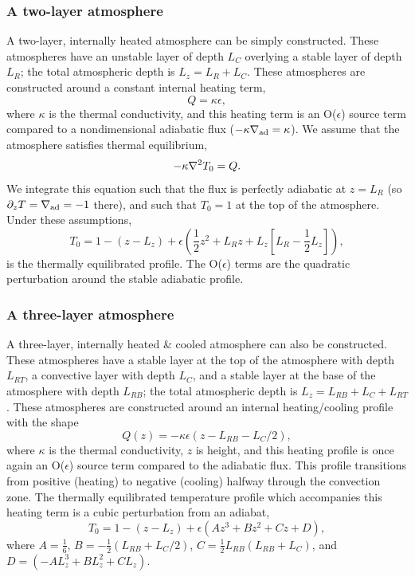 \subsubsection{A two-layer atmosphere}
A two-layer, internally heated atmosphere can be simply constructed.
These atmospheres have an unstable layer of depth $L_C$ overlying a stable layer of depth $L_R$; the total atmospheric depth is $L_z = L_R + L_C$.
These atmospheres are constructed around a constant internal heating term,
\begin{equation}
Q = \kappa \epsilon,
\end{equation}
where $\kappa$ is the thermal conductivity, and this heating term is an O($\epsilon$) source term compared to a nondimensional adiabatic flux ($-\kappa\nabla_{\text{ad}} = \kappa$).
We assume that the atmosphere satisfies thermal equilibrium,
$$
-\kappa \nabla^2 T_0 = Q.
$$
We integrate this equation such that the flux is perfectly adiabatic at $z = L_R$ (so $\partial_z T = \nabla_{\text{ad}} = -1$ there), and such that $T_0 = 1$ at the top of the atmosphere.
Under these assumptions,
\begin{equation}
T_0 = 1 - (z - L_z) + \epsilon\left(\frac{1}{2} z^2 + L_R z + L_z \left[L_R - \frac{1}{2}L_z\right]\right),
\end{equation}
is the thermally equilibrated profile.
The O($\epsilon$) terms are the quadratic perturbation around the stable adiabatic profile.



\subsubsection{A three-layer atmosphere}
A three-layer, internally heated \& cooled atmosphere can also be constructed.
These atmospheres have a stable layer at the top of the atmosphere with depth $L_{RT}$, a convective layer with depth $L_C$, and a stable layer at the base of the atmosphere with depth $L_{RB}$; the total atmospheric depth is $L_z = L_{RB} + L_C + L_{RT}$.
These atmospheres are constructed around an internal heating/cooling profile with the shape
\begin{equation}
Q(z) = -\kappa \epsilon(z - L_{RB} - L_C/2),
\end{equation}
where $\kappa$ is the thermal conductivity, $z$ is height, and this heating profile is once again an O($\epsilon$) source term compared to the adiabatic flux.
This profile transitions from positive (heating) to negative (cooling) halfway through the convection zone.
The thermally equilibrated temperature profile which accompanies this heating term is a cubic perturbation from an adiabat,
\begin{equation}
T_0 = 1 - (z - L_z) + \epsilon(A z^3 + B z^2 + Cz + D),
\end{equation}
where $A = \frac{1}{6}$, $B = -\frac{1}{2}(L_{RB} + L_C/2)$, $C = \frac{1}{2}L_{RB}(L_{RB} + L_C)$, and $D = (-AL_z^3 + BL_z^2 + CL_z)$.


